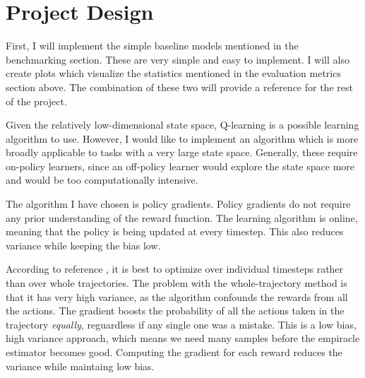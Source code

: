 \documentclass[12pt,a4paper]{article}
\begin{document}
\section*{Project Design}
%
First, I will implement the simple baseline models mentioned in the benchmarking section. These are very simple and easy to implement. I will also create plots which visualize the statistics mentioned in the evaluation metrics section above. The combination of these two will provide a reference for the rest of the project.

Given the relatively low-dimensional state space, Q-learning is a possible learning algorithm to use. However, I would like to implement an algorithm which is more broadly applicable to tasks with a very large state space. Generally, these require on-policy learners, since an off-policy learner would explore the state space more and would be too computationally intensive.

The algorithm I have chosen is policy gradients. Policy gradients do not require any prior understanding of the reward function.\cite{pg_lecture} The learning algorithm is online, meaning that the policy is being updated at every timestep. This also reduces variance while keeping the bias low.\cite{pg_lecture}

According to reference \cite{pg_lecture}, it is best to optimize over individual timesteps rather than over whole trajectories. The problem with the whole-trajectory method is that it has very high variance, as the algorithm confounds the rewards from all the actions. The gradient boosts the probability of all the actions taken in the trajectory \textit{equally}, reguardless if any single one was a mistake. This is a low bias, high variance approach, which means we need many samples before the empiracle estimator becomes good. Computing the gradient for each reward reduces the variance while maintaing low bias.
\end{document}
